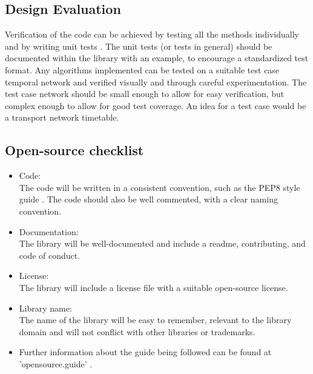 \begin{design}
\subsection{Design Evaluation}
Verification of the code can be achieved by testing all the methods individually and by writing unit tests \cite{unittest}. The unit tests (or tests in general) should be documented within the library with an example, to encourage a standardized test format. Any algorithms implemented can be tested on a suitable test case temporal network and verified visually and through careful experimentation. The test case network should be small enough to allow for easy verification, but complex enough to allow for good test coverage. An idea for a test case would be a transport network timetable.
\clearpage
\subsection{Open-source checklist}
\begin{itemize}
  \item Code:\\
  The code will be written in a consistent convention, such as the PEP8 style guide \cite{pep8}. The code should also be well commented, with a clear naming convention.
  \item Documentation:\\
  The library will be well-documented and include a readme, contributing, and code of conduct.
  \item License:\\
  The library will include a license file with a suitable open-source license.
  \item Library name:\\
  The name of the library will be easy to remember, relevant to the library domain and will not conflict with other libraries or trademarks.
  \item Further information about the guide being followed can be found at 'opensource.guide' \cite{open_source}.
\end{itemize}

\end{design}
